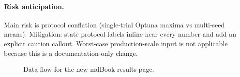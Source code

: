 \documentclass{article}
\begin{document}
\paragraph{Risk anticipation.}
Main risk is protocol conflation (single-trial Optuna maxima vs multi-seed
means). Mitigation: state protocol labels inline near every number and add an
explicit caution callout. Worst-case production-scale input is not applicable
because this is a documentation-only change.

\begin{figure}[h]
\centering

\caption{Data flow for the new mdBook results page.}
\end{figure}
\end{document}
